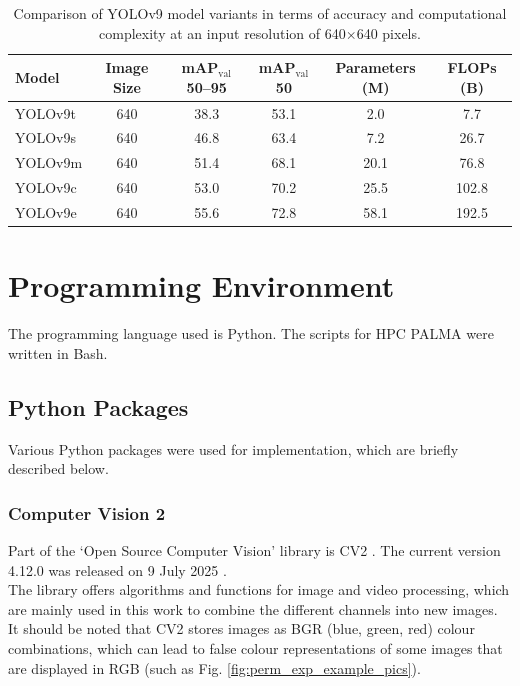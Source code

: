 \begin{table}[h]
\centering
\begin{tabular}{l|c|c|c|c|c} %
\textbf{Model} & \textbf{Image Size} & \textbf{mAP$_{\text{val}}$ 50--95} & \textbf{mAP$_{\text{val}}$ 50} & \textbf{Parameters (M)} & \textbf{FLOPs (B)} \\
\hline
YOLOv9t & 640 & 38.3 & 53.1 & 2.0 & 7.7 \\
YOLOv9s & 640 & 46.8 & 63.4 & 7.2 & 26.7 \\
YOLOv9m & 640 & 51.4 & 68.1 & 20.1 & 76.8 \\
YOLOv9c & 640 & 53.0 & 70.2 & 25.5 & 102.8 \\
YOLOv9e & 640 & 55.6 & 72.8 & 58.1 & 192.5 \\
\end{tabular}
\caption[Comparison of YOLOv9 model variants]{Comparison of YOLOv9 model variants in terms of accuracy and computational complexity at an input resolution of 640$\times$640 pixels. \cite{ultralyics_yolov9,wang2024_sapkota}}
\label{tab:yolov9-models}
\end{table}





\section{Programming Environment}
The programming language used is Python. The scripts for \acrlong{HPC} \acrshort{PALMA} were written in Bash.

\subsection{Python Packages}
Various Python packages were used for implementation, which are briefly described below.
 
\subsubsection{Computer Vision 2}
Part of the ‘Open Source Computer Vision’ library is \Acrfull{CV2} \cite{opencv_about}. The current version 4.12.0 was released on 9 July 2025 \cite{opencv_release}. \\
The library offers algorithms and functions for image and video processing, which are mainly used in this work to combine the different channels into new images. It should be noted that \acrshort{CV2} stores images as BGR (blue, green, red) colour combinations, which can lead to false colour representations of some images that are displayed in RGB (such as Fig. \ref{fig:perm_exp_example_pics}).
